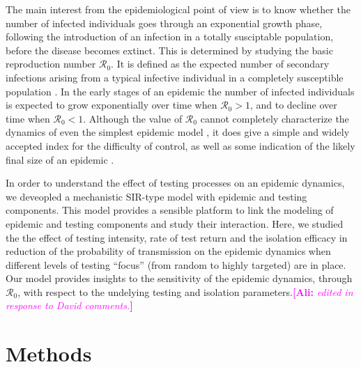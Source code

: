 \documentclass[12pt]{article}
\newcommand{\Rnum}{\ensuremath{\mathcal{R}_0}}
\DeclareRobustCommand\_{\ifmmode\expandafter\subtxt\else\textunderscore\fi}
\newcommand{\comment}{\showcomment}
\newcommand{\showcomment}[3]{\textcolor{#1}{\textbf{[#2: }\textsl{#3}\textbf{]}}}
\newcommand{\ali}[1]{\comment{magenta}{Ali}{#1}}
\theoremstyle{definition} %
\begin{document}
The main interest from the epidemiological point of view is to know whether the number of infected individuals goes through an exponential growth phase, following the introduction of an infection in a totally susciptable population, before the disease becomes extinct. This is determined by studying the basic reproduction number $\Rnum$. It is defined as the expected number of secondary infections arising from a typical infective individual in a completely susceptible population \citep{dietz1993estimation}. 
In the early stages of an epidemic the number of infected individuals is expected to grow exponentially over time when $\Rnum>1$, and to decline over time when $\Rnum<1$. 
Although the value of $\Rnum$ cannot completely characterize the dynamics of even the simplest epidemic model
\citep{shaw2021what}, it does give a simple and widely accepted index for the difficulty of control, as well as some indication of the likely final size of an epidemic \citep{ma2006generality}.  

In order to understand the effect of testing processes on an epidemic dynamics, we deveopled a mechanistic SIR-type model with epidemic and testing components. This model provides a sensible platform to link the modeling of epidemic and testing components and study their interaction. Here, we studied the the effect of testing intensity, rate of test return and the isolation efficacy in reduction of the probability of transmission on the epidemic dynamics when different levels of testing ``focus'' (from random to highly targeted) are in place. Our model provides insights to the sensitivity of the epidemic dynamics, through $\Rnum$, with respect to the undelying testing and isolation parameters.\ali{edited in response to David comments.}

\section{Methods}
\end{document}
